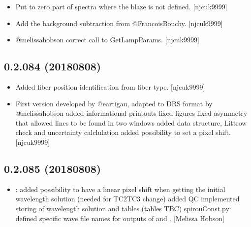 \documentclass[a4paper,10pt,english]{report}
\begin{document}
\begin{itemize}
\item {} 
Put to zero part of spectra where the blaze is not defined.
{[}njcuk9999{]}

\item {} 
Add the background subtraction \sphinxhyphen{} from @FrancoisBouchy. {[}njcuk9999{]}

\item {} 
@melissa\sphinxhyphen{}hobson correct call to GetLampParams. {[}njcuk9999{]}

\end{itemize}


\subsection{0.2.084 (2018\sphinxhyphen{}08\sphinxhyphen{}08)}
\label{\detokenize{misc/changelog:id397}}\begin{itemize}
\item {} 
Added fiber position identification from fiber type. {[}njcuk9999{]}

\item {} 
First version  developed by @eartigau, adapted to DRS format
by @melissa\sphinxhyphen{}hobson added informational printouts \sphinxhyphen{} fixed figures \sphinxhyphen{}
fixed asymmetry that allowed lines to be found in two windows \sphinxhyphen{} added
 data structure, Littrow check and uncertainty calclulation
added possibility to set a pixel shift. {[}njcuk9999{]}

\end{itemize}


\subsection{0.2.085 (2018\sphinxhyphen{}08\sphinxhyphen{}08)}
\label{\detokenize{misc/changelog:id398}}\begin{itemize}
\item {} 
: \sphinxhyphen{} added possibility to have a linear pixel
shift when getting the initial wavelength solution (needed for TC2\sphinxhyphen{}TC3
change) \sphinxhyphen{} added QC \sphinxhyphen{} implemented storing of wavelength solution and
tables (tables TBC) spirouConst.py: defined specific wave file names
for outputs of  and .
{[}Melissa Hobson{]}

\end{itemize}
\end{document}
